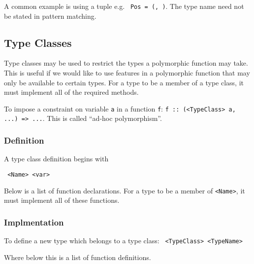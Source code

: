 A common example is using a tuple e.g. \texttt{ Pos = (, )}. The type name need not be stated in pattern matching.

\subsection{Type Classes}
Type classes may be used to restrict the types a polymorphic function may take. This is useful if we would like to use features in a polymorphic function that may only be available to certain types. For a type to be a member of a type class, it must implement all of the required methods.

To impose a constraint on variable \texttt{a} in a function \texttt{f}: \texttt{f :: (\texttt<TypeClass> a, ...) => ...}. This is called ``ad-hoc polymorphism''.

\subsubsection{Definition}
A type class definition begins with

\texttt{ <Name> <var> }

Below is a list of function declarations. For a type to be a member of \texttt{<Name>}, it must implement all of these functions.

\subsubsection{Implmentation}
To define a new type which belongs to a type class:
\texttt{ <TypeClass> <TypeName> }

Where below this is a list of function definitions.

